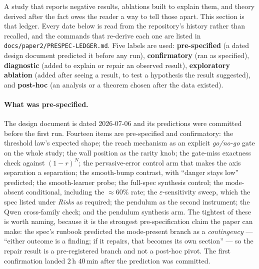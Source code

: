 
A study that reports negative results, ablations built to explain them, and theory derived
after the fact owes the reader a way to tell those apart. This section is that ledger. Every
date below is read from the repository's history rather than recalled, and the commands that
re-derive each one are listed in \texttt{docs/\allowbreak paper2/\allowbreak PRESPEC-LEDGER.\allowbreak md}. Five labels are
used: \textbf{pre-specified} (a dated design document predicted it before any run),
\textbf{confirmatory} (ran as specified), \textbf{diagnostic} (added to explain or repair an
observed result), \textbf{exploratory ablation} (added after seeing a result, to test a
hypothesis the result suggested), and \textbf{post-hoc} (an analysis or a theorem chosen
after the data existed).

\paragraph{What was pre-specified.} The design document is dated 2026-07-06 and its
predictions were committed before the first run. Fourteen items are pre-specified and
confirmatory: the threshold law's expected shape; the reach mechanism as an explicit
\emph{go/no-go} gate on the whole study; the wall position as the rarity knob; the
gate-miss exactness check against $(1-r)^N$; the pervasive-error control arm that makes the
axis separation a separation; the smooth-bump contrast, with ``danger stays low'' predicted;
the smooth-learner probe; the full-spec synthesis control; the mode-absent conditional,
including the ${\approx}60\%$ rate; the $\varepsilon$-sensitivity sweep, which the spec
listed under \emph{Risks} as required; the pendulum as the second instrument; the Qwen
cross-family check; and the pendulum synthesis arm. The tightest of these is worth naming,
because it is the strongest pre-specification claim the paper can make: the spec's runbook
predicted the mode-present branch as a \emph{contingency} --- ``either outcome is a finding;
if it repairs, that becomes its own section'' --- so the repair result is a pre-registered
branch and not a post-hoc pivot. The first confirmation landed $2$\,h $40$\,min after the
prediction was committed.

